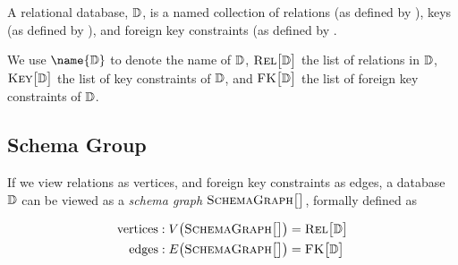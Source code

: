 	\begin{defn}
	\label{def:relational-database}
		A relational database, $\mathbb{D}$, is a named collection of relations (as defined by ), keys (as defined by ), and foreign key constraints (as defined by .
		
		We use $\name{\db}$ to denote the name of $\mathbb{D}$, $\textsc{Rel}\bigl[\mathbb{D}\bigr]$ the list of relations in $\mathbb{D}$, $\textsc{Key}\bigl[\mathbb{D}\bigr]$ the list of key constraints of $\mathbb{D}$, and $\textsc{FK}\bigl[\mathbb{D}\bigr]$ the list of foreign key constraints of $\mathbb{D}$.
	\end{defn}
	
	\subsection{Schema Group}
		\begin{defn}
			If we view relations as vertices, and foreign key constraints as edges, a database $\mathbb{D}$ can be viewed as a \emph{schema graph} $\textsc{SchemaGraph}\bigl[\bigr]$, formally defined as
			
			\begin{align}
				\mathrm{vertices}:	V\bigl(\textsc{SchemaGraph}\bigl[\bigr]\bigr) &= \textsc{Rel}\bigl[\mathbb{D}\bigr] \\
				\mathrm{edges}:	 E\bigl(\textsc{SchemaGraph}\bigl[\bigr]\bigr) &= \textsc{FK}\bigl[\mathbb{D}\bigr]
			\end{align}
		\end{defn}
		
